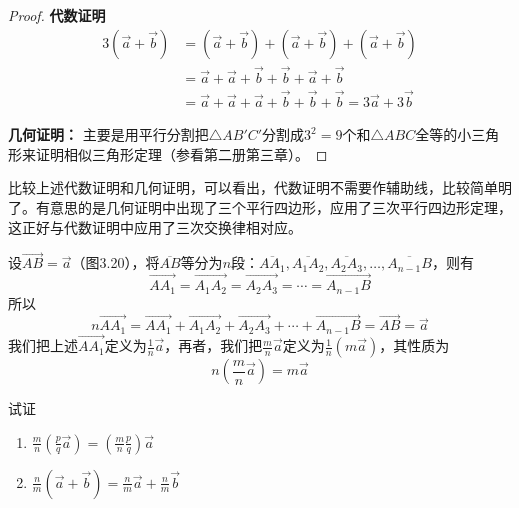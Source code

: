 \begin{proof}
\textbf{代数证明}
\begin{align*}
3 \left(\vec{a}+\vec{b}\right) &= \left(\vec{a}+\vec{b}\right)+\left(\vec{a}+\vec{b}\right)+\left(\vec{a}+\vec{b}\right)  \tag{用一次交换律}\\
&=\vec{a}+\vec{a}+\vec{b}+\vec{b}+\vec{a}+\vec{b} \tag{用两次交换律}\\
&= \vec{a}+\vec{a}+\vec{a}+\vec{b}+\vec{b}+\vec{b} =3\vec{a}+3\vec{b}
\end{align*}

\textbf{几何证明：}
主要是用平行分割把$\triangle AB'C'$分割成$3^2=9$个和$\triangle ABC$全等的小三角形来证明相似三角形定理（参看第二册第三章）。
\end{proof}

比较上述代数证明和几何证明，可以看出，代数证明不需要作辅助线，比较简单明了。有意思的是几何证明中出现了三个平行四边形，应用了三次平行四边形定理，这正好与代数证明中应用了三次交换律相对应。

设$\Vec{AB}=\vec{a}$（图3.20），将$\overline{AB}$等分为$n$段：$\overline{AA_1},\overline{A_1A_2},\overline{A_2A_3},\ldots,\overline{A_{n-1}B}$，则有
\[\Vec{AA_1}=\Vec{A_1A_2}=\Vec{A_2A_3}=\cdots=\Vec{A_{n-1}B}\]
所以
\[n\Vec{AA_1}=\Vec{AA_1}+\Vec{A_1A_2}+\Vec{A_2A_3}+\cdots+\Vec{A_{n-1}B}=\Vec{AB}=\vec{a}\]
我们把上述$\Vec{AA_1}$定义为$\frac{1}{n}\vec{a}$，再者，我们把$\frac{m}{n}\vec{a}$定义为$\frac{1}{n}\left(m\vec{a}\right)$，其性质为
\[n\left(\frac{m}{n}\vec{a}\right)=m\vec{a}\]


\begin{example}
    试证
\begin{enumerate}
    \item $\frac{m}{n}\left(\frac{p}{q}\vec{a}\right)=\left(\frac{m}{n}\frac{p}{q}\right)\vec{a}$
    \item $\frac{n}{m}\left(\vec{a}+\vec{b}\right)=\frac{n}{m}\vec{a}+\frac{n}{m}\vec{b}$
\end{enumerate}
\end{example}

